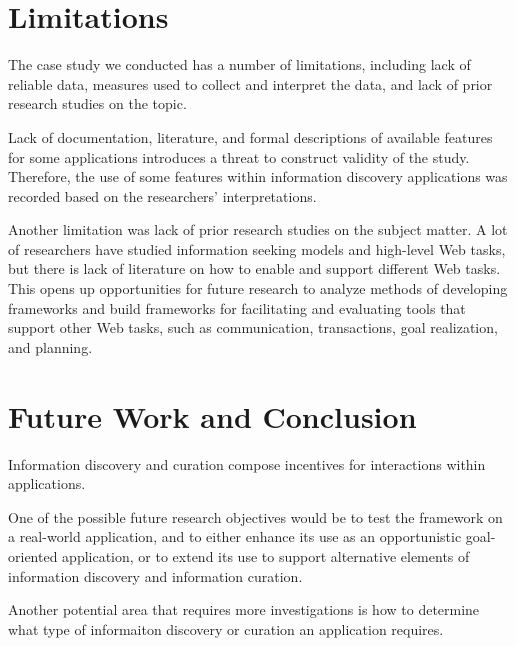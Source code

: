 \documentclass{casconpaper}
\begin{document}
{\section{Limitations}
The case study we conducted has a number of limitations, including lack of reliable data, measures used to collect and interpret the data, and lack of prior research studies on the topic. 

Lack of documentation, literature, and formal descriptions of available features for some applications introduces a threat to construct validity of the study. Therefore, the use of some features within information discovery applications was recorded based on the researchers' interpretations. 

Another limitation was lack of prior research studies on the subject matter. A lot of researchers have studied information seeking models and high-level Web tasks, but there is lack of literature on how to enable and support different Web tasks. This opens up opportunities for future research to analyze methods of developing frameworks and build frameworks for facilitating and evaluating tools that support other Web tasks, such as communication, transactions, goal realization, and planning.

} %

{\section{ Future Work and Conclusion }
Information discovery and curation compose incentives for interactions within applications. 

One of the possible future research objectives would be to test the framework on a real-world application, and to either enhance its use as an opportunistic goal-oriented application, or to extend its use  to support alternative elements of information discovery and information curation. 

Another potential area that requires more investigations is how to determine what type of informaiton discovery or curation an application requires.



} %
\end{document}
